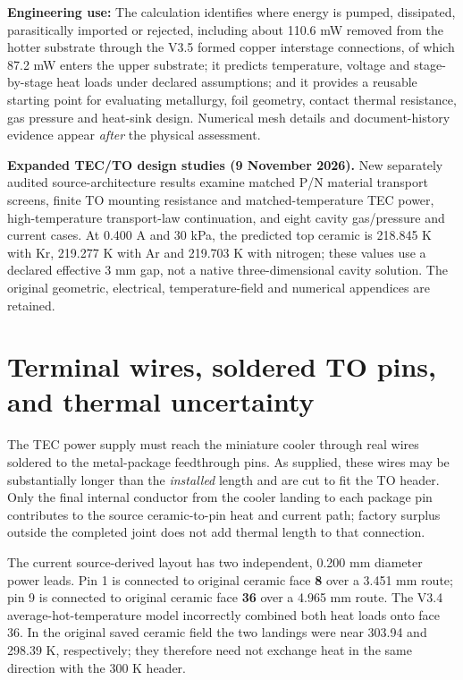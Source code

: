 \documentclass[10pt,a4paper]{article}
\begin{document}
\textbf{Engineering use:} The calculation identifies where energy is pumped, dissipated, parasitically imported or rejected, including about 110.6 mW removed from the hotter substrate through the V3.5 formed copper interstage connections, of which 87.2 mW enters the upper substrate; it predicts temperature, voltage and stage-by-stage heat loads under declared assumptions; and it provides a reusable starting point for evaluating metallurgy, foil geometry, contact thermal resistance, gas pressure and heat-sink design. Numerical mesh details and document-history evidence appear \emph{after} the physical assessment.
\clearpage
\vspace{2mm}\par\textbf{Expanded TEC/TO design studies (9 November 2026).} New separately audited source-architecture results examine matched P/N material transport screens, finite TO mounting resistance and matched-temperature TEC power, high-temperature transport-law continuation, and eight cavity gas/pressure and current cases. At 0.400 A and 30 kPa, the predicted top ceramic is 218.845 K with Kr, 219.277 K with Ar and 219.703 K with nitrogen; these values use a declared effective 3 mm gap, not a native three-dimensional cavity solution. The original geometric, electrical, temperature-field and numerical appendices are retained.\par
\begingroup\small\setlength{\parskip}{0pt}\tableofcontents\endgroup\clearpage

\section{Terminal wires, soldered TO pins, and thermal uncertainty}
The TEC power supply must reach the miniature cooler through real wires soldered to the metal-package feedthrough pins. As supplied, these wires may be substantially longer than the \emph{installed} length and are cut to fit the TO header. Only the final internal conductor from the cooler landing to each package pin contributes to the source ceramic-to-pin heat and current path; factory surplus outside the completed joint does not add thermal length to that connection.

The current source-derived layout has two independent, 0.200 mm diameter power leads. Pin 1 is connected to original ceramic face \textbf{8} over a 3.451 mm route; pin 9 is connected to original ceramic face \textbf{36} over a 4.965 mm route. The V3.4 average-hot-temperature model incorrectly combined both heat loads onto face 36. In the original saved ceramic field the two landings were near 303.94 and 298.39 K, respectively; they therefore need not exchange heat in the same direction with the 300 K header.
\end{document}
